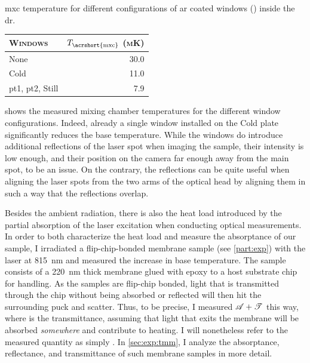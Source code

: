 \begin{margintable}
    \centering
    \footnotesize
    \caption{
        \Gls{mxc} temperature for different configurations of \gls{ar} coated windows (\thewindow) inside the \gls{dr}.
    }
    \label{tab:setup:cooling:windows}
    \begin{tabular}{lr}
        \toprule
        \textsc{Windows}                      & $T_\mathrm{\acrshort{mxc}}$ \textsc{(mK)} \\
        \midrule
        None                                  & 30.0                                      \\
        Cold                                  & 11.0                                      \\
        \acrshort{pt1}, \acrshort{pt2}, Still & 7.9                                       \\
        \bottomrule
    \end{tabular}
\end{margintable}

 shows the measured mixing chamber temperatures for the different window configurations.
Indeed, already a single window installed on the Cold plate significantly reduces the base temperature.
While the windows do introduce additional reflections of the laser spot when imaging the sample, their intensity is low enough, and their position on the camera far enough away from the main spot, to be an issue.
On the contrary, the reflections can be quite useful when aligning the laser spots from the two arms of the optical head by aligning them in such a way that the reflections overlap.

Besides the ambient radiation, there is also the heat load introduced by the partial absorption of the laser excitation when conducting optical measurements.
In order to both characterize the heat load and measure the absorptance \absorptance of our sample, I irradiated a flip-chip-bonded membrane sample (see \cref{part:exp}) with the laser at \qty{815}{\nano\meter} and measured the increase in base temperature.
The sample consists of a \qty{220}{\nano\meter} thick \GaAsAlGaAs membrane glued with epoxy to a  host substrate chip for handling.
As the samples are flip-chip bonded, light that is transmitted through the chip without being absorbed or reflected will then hit the surrounding puck and scatter.
Thus, to be precise, I measured $\mathscr{A}+\mathscr{T}$ this way, where \transmittance is the transmittance, assuming that light that exits the membrane will be absorbed \emph{somewhere} and contribute to heating.
I will nonetheless refer to the measured quantity as simply \absorptance.
In \cref{sec:exp:tmm}, I analyze the absorptance, reflectance, and transmittance of such membrane samples in more detail.

